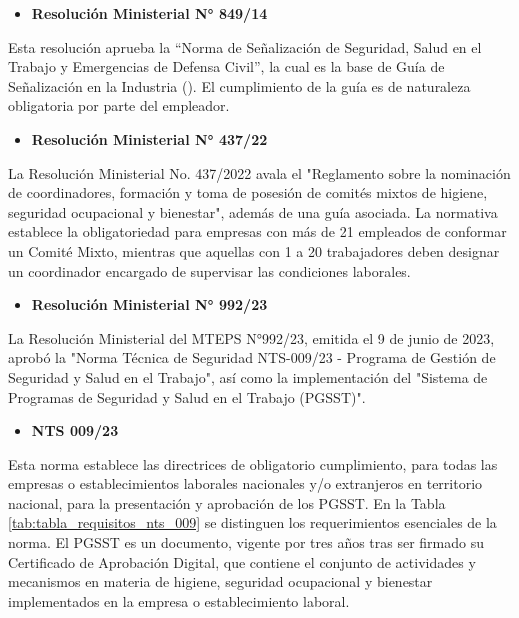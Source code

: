 \begin{samepage}
\begin{itemize} [wide=0pt, topsep=0pt] \item \textbf{Resolución Ministerial N° 849/14} \end{itemize} 

\indent
Esta resolución aprueba la ``Norma de Señalización de Seguridad, Salud en el Trabajo y Emergencias de
Defensa Civil'', la cual es la base de Guía de Señalización en la Industria (\cite{guiaSeñalizacion}). El cumplimiento de la guía es de naturaleza obligatoria por parte del empleador.
\end{samepage}

\begin{samepage}
\begin{itemize} [wide=0pt, topsep=0pt] \item \textbf{Resolución Ministerial N° 437/22} \end{itemize} 

\indent
La Resolución Ministerial No. 437/2022 avala el "Reglamento sobre la nominación de coordinadores, formación y toma de posesión de comités mixtos de higiene, seguridad ocupacional y bienestar", además de una guía asociada. La normativa establece la obligatoriedad para empresas con más de 21 empleados de conformar un Comité Mixto, mientras que aquellas con 1 a 20 trabajadores deben designar un coordinador encargado de supervisar las condiciones laborales.
\end{samepage}

\begin{samepage}
\begin{itemize} [wide=0pt, topsep=0pt] \item \textbf{Resolución Ministerial N° 992/23} \end{itemize} 

\indent
La Resolución Ministerial del MTEPS N°992/23, emitida el 9 de junio de 2023, aprobó la "Norma Técnica de Seguridad NTS-009/23 - Programa de Gestión de Seguridad y Salud en el Trabajo", así como la implementación del "Sistema de Programas de Seguridad y Salud en el Trabajo (PGSST)". 
\end{samepage}

\begin{samepage}
\begin{itemize} [wide=0pt, topsep=0pt] \item \textbf{NTS 009/23} \end{itemize}

\indent
Esta norma establece las directrices de obligatorio cumplimiento, para todas las empresas o establecimientos
laborales nacionales y/o extranjeros en territorio nacional, para la presentación y aprobación de los PGSST. En la Tabla \ref{tab:tabla_requisitos_nts_009} se distinguen los requerimientos esenciales de la norma. 
El PGSST es un documento, vigente por tres años tras ser firmado su Certificado de Aprobación Digital,  que contiene el conjunto de actividades y mecanismos en materia de higiene, seguridad ocupacional y bienestar implementados en la empresa o establecimiento laboral.
\end{samepage}

